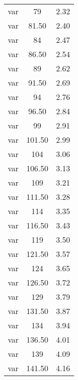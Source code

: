 \begin{center}
\begin{longtable}[h]{ccc}
var & 79 & 2.32 \\

var & 81.50 & 2.40 \\

var & 84 & 2.47 \\

var & 86.50 & 2.54 \\

var & 89 & 2.62 \\

var & 91.50 & 2.69 \\

var & 94 & 2.76 \\

var & 96.50 & 2.84 \\

var & 99 & 2.91 \\

var & 101.50 & 2.99 \\

var & 104 & 3.06 \\

var & 106.50 & 3.13 \\

var & 109 & 3.21 \\

var & 111.50 & 3.28 \\

var & 114 & 3.35 \\

var & 116.50 & 3.43 \\

var & 119 & 3.50 \\

var & 121.50 & 3.57 \\

var & 124 & 3.65 \\

var & 126.50 & 3.72 \\

var & 129 & 3.79 \\

var & 131.50 & 3.87 \\

var & 134 & 3.94 \\

var & 136.50 & 4.01 \\

var & 139 & 4.09 \\

var & 141.50 & 4.16 \\


\end{longtable}
\end{center}
